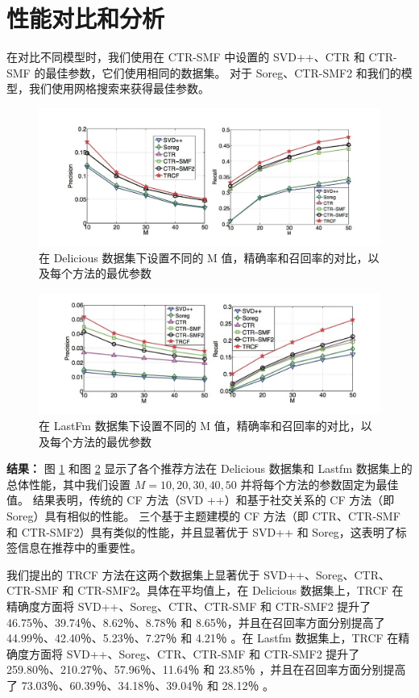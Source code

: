 \section{性能对比和分析}
在对比不同模型时，我们使用在 CTR-SMF \cite{purushotham2012collaborative} 中设置的 SVD++、CTR 和 CTR-SMF 的最佳参数，它们使用相同的数据集。 对于 Soreg、CTR-SMF2 和我们的模型，我们使用网格搜索来获得最佳参数。
\begin{figure}
\includegraphics[width=\linewidth]{images/figure3.jpg}
\caption{在 Delicious 数据集下设置不同的 M 值，精确率和召回率的对比，以及每个方法的最优参数}
\label{fig:fig3}
\end{figure}
\begin{figure}
\includegraphics[width=\linewidth]{images/figure4.jpg}
\caption{在 LastFm 数据集下设置不同的 M 值，精确率和召回率的对比，以及每个方法的最优参数}
\label{fig:fig4}
\end{figure}


\textbf{结果：} 图 \ref{fig:fig3} 和图 \ref{fig:fig4} 显示了各个推荐方法在 Delicious 数据集和 Lastfm 数据集上的总体性能，其中我们设置 $M = 10,20,30,40,50$ 并将每个方法的参数固定为最佳值。 结果表明，传统的 CF 方法（SVD ++）和基于社交关系的 CF 方法（即 Soreg）具有相似的性能。 三个基于主题建模的 CF 方法（即 CTR、CTR-SMF 和 CTR-SMF2）具有类似的性能，并且显著优于 SVD++ 和 Soreg，这表明了标签信息在推荐中的重要性。

我们提出的 TRCF 方法在这两个数据集上显著优于 SVD++、Soreg、CTR、CTR-SMF 和 CTR-SMF2。具体在平均值上，在 Delicious 数据集上，TRCF 在精确度方面将 SVD++、Soreg、CTR、CTR-SMF 和 CTR-SMF2 提升了 46.75％、39.74％、8.62％、8.78％ 和 8.65％，并且在召回率方面分别提高了 44.99％、42.40％、5.23％、7.27％ 和 4.21％ 。在 Lastfm 数据集上，TRCF 在精确度方面将 SVD++、Soreg、CTR、CTR-SMF 和 CTR-SMF2 提升了 259.80％、210.27％、57.96％、11.64％ 和 23.85％ ，并且在召回率方面分别提高了 73.03％、60.39％、34.18％、39.04％ 和 28.12％ 。


